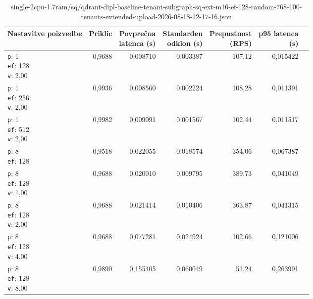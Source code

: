 \begin{table}[htbp]
  \centering
\small
  \caption{single-2cpu-1.7ram/sq/qdrant-dipl-baseline-tenant-subgraph-sq-ext-m16-ef-128-random-768-100-tenants-extended-upload-2026-08-18-12-17-16.json}
  \label{tab:single-2cpu-1.7ram:sq:qdrant-dipl-baseline-tenant-subgraph-sq-ext-m16-ef-128-random-768-100-tenants-extended-upload-2026-08-18-12-17-16.json}
  \begin{tabularx}{\textwidth}{Xrrrrrr}
    \toprule
    Nastavitve poizvedbe & Priklic & \makecell{Povprečna\\latenca (s)} & \makecell{Standarden\\odklon (s)} & \makecell{Prepustnost\\(RPS)} & \makecell{p95 latenca\\(s)}  \\
    \midrule
    \makecell{\texttt{p}: 1\\\texttt{ef}: 128\\\texttt{v}: 2,00} & 0,9688 & 0,008710 & 0,003387 & 107,12 & 0,015422 \\
    \makecell{\texttt{p}: 1\\\texttt{ef}: 256\\\texttt{v}: 2,00} & 0,9936 & 0,008560 & 0,002224 & 108,28 & 0,011391 \\
    \makecell{\texttt{p}: 1\\\texttt{ef}: 512\\\texttt{v}: 2,00} & 0,9982 & 0,009091 & 0,001567 & 102,44 & 0,011517 \\
    \makecell{\texttt{p}: 8\\\texttt{ef}: 128} & 0,9518 & 0,022055 & 0,018574 & 354,06 & 0,067387 \\
    \makecell{\texttt{p}: 8\\\texttt{ef}: 128\\\texttt{v}: 1,00} & 0,9688 & 0,020010 & 0,009795 & 389,73 & 0,041049 \\
    \makecell{\texttt{p}: 8\\\texttt{ef}: 128\\\texttt{v}: 2,00} & 0,9688 & 0,021414 & 0,010406 & 363,87 & 0,041315 \\
    \makecell{\texttt{p}: 8\\\texttt{ef}: 128\\\texttt{v}: 4,00} & 0,9688 & 0,077281 & 0,024924 & 102,66 & 0,121006 \\
    \makecell{\texttt{p}: 8\\\texttt{ef}: 128\\\texttt{v}: 8,00} & 0,9890 & 0,155405 & 0,060049 & 51,24 & 0,263991 \\

\end{tabularx}
\end{table}
